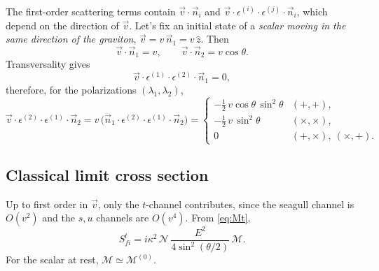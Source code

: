 \documentclass[12pt,a4paper,oneside]{article}
\numberwithin{equation}{section}   %
\begin{document}
The first-order scattering terms contain $\vec v\cdot\vec n_i$ and
$\vec v\cdot\epsilon^{(i)}\cdot\epsilon^{(j)}\cdot\vec n_i$, which depend on
the direction of $\vec v$. Let's fix an initial state
of a \textit{scalar moving in the same direction of
the graviton}, $\vec v=v\,\vec n_1=v\,\hat z$. Then
\begin{equation}
\vec v\cdot\vec n_1=v,\qquad \vec v\cdot\vec n_2=v\cos\theta .
\end{equation}
Transversality gives
\begin{equation}
\vec v\cdot\epsilon^{(1)}\cdot\epsilon^{(2)}\cdot\vec n_1=0 ,
\end{equation}
therefore, for the polarizations $(\lambda_1,\lambda_2)$,
\begin{equation}
\vec v\cdot\epsilon^{(2)}\cdot\epsilon^{(1)}\cdot\vec n_2
=v\,\bigl(\vec n_1\cdot\epsilon^{(2)}\cdot\epsilon^{(1)}\cdot\vec n_2\bigr)
=\begin{cases}
-\tfrac12\,v\cos\theta\,\sin^2\theta & (+,+),\\[2pt]
-\tfrac12\,v\,\sin^2\theta & (\times,\times),\\[2pt]
0 & (+,\times),\ (\times,+).
\end{cases}
\label{eq:vpol}
\end{equation}

\subsection{Classical limit cross section}

Up to first order in $\vec v$, only the $t$-channel contributes, since the
seagull channel is $O(v^2)$ and the $s,u$ channels are $O(v^4)$. From
\eqref{eq:Mt},
\begin{equation}
S^{t}_{fi}=i\kappa^2\,\mathcal N\,\frac{E^2}{4\sin^2(\theta/2)}\,\mathcal M .
\end{equation}
For the scalar at rest, $\mathcal M\simeq\mathcal M^{(0)}$.
\end{document}
